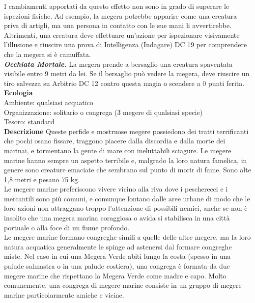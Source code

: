 \begin{multicols}{2}
I cambiamenti apportati da questo effetto non sono in grado di superare le ispezioni fisiche. Ad esempio, la megera potrebbe apparire come una creatura priva di artigli, ma una persona in contatto con le sue mani li avvertirebbe. Altrimenti, una creatura deve effettuare un'azione per ispezionare visivamente l'illusione e riuscire una prova di Intelligenza (Indagare) DC  19 per comprendere che la megera si è camuffata.\\

\emph{\textbf{Occhiata Mortale.}} La megera prende a bersaglio una creatura spaventata visibile entro 9 metri da lei. Se il bersaglio può vedere la megera, deve riuscire un tiro salvezza su Arbitrio DC  12 contro questa magia o scendere a 0 punti ferita.
\textbf{Ecologia}\\
Ambiente: qualsiasi acquatico\\
Organizzazione: solitario o congrega (3 megere di qualsiasi specie)\\
Tesoro: standard\\
\textbf{Descrizione}
Queste perfide e mostruose megere possiedono dei tratti terrificanti che pochi osano fissare, traggono piacere dalla discordia e dalla morte dei marinai, e tormentano la gente di mare con ineluttabili sciagure. Le megere marine hanno sempre un aspetto terribile e, malgrado la loro natura famelica, in genere sono creature emaciate che sembrano sul punto di morir di fame. Sono alte 1,8 metri e pesano 75 kg.\\

Le megere marine preferiscono vivere vicino alla riva dove i pescherecci e i mercantili sono più comuni, e comunque lontano dalle aree urbane di modo che le loro azioni non attraggano troppo l'attenzione di possibili nemici, anche se non è insolito che una megera marina coraggiosa o avida si stabilisca in una città portuale o alla foce di un fiume profondo.\\

Le megere marine formano congreghe simili a quelle delle altre megere, ma la loro natura acquatica generalmente le spinge ad astenersi dal formare congreghe miste. Nel caso in cui una Megera Verde abiti lungo la costa (spesso in una palude salmastra o in una palude costiera), una congrega è formata da due megere marine che rispettano la Megera Verde come madre e capo. Molto comunemente, una congrega di megere marine consiste in un gruppo di megere marine particolarmente amiche e vicine.\\


\end{multicols}
